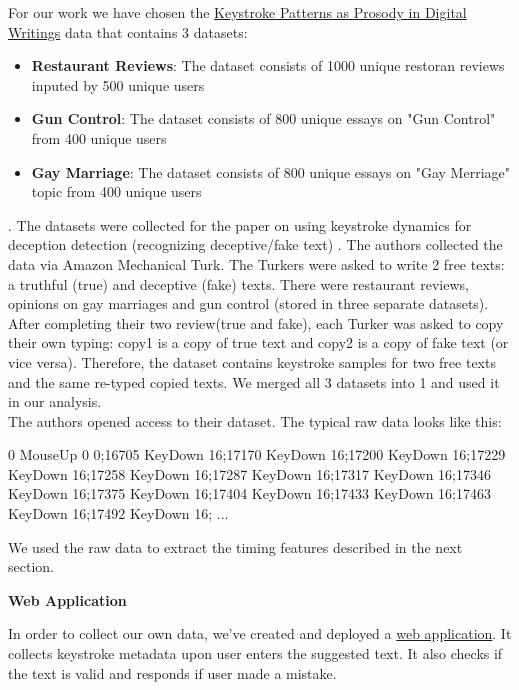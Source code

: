\documentclass[12pt,a4]{article}
\begin{document}
\normalsize
For our work we have chosen the  \href{http://www3.cs.stonybrook.edu/~rbanerjee/project-pages/keystrokes/keystrokes.html}{Keystroke Patterns as Prosody in Digital Writings} data \cite{banerjee2014_emnlp} that contains 3 datasets: \begin{itemize}
	\item \textbf{Restaurant Reviews}: The dataset consists of 1000 unique restoran reviews inputed by 500 unique users
	\item \textbf{Gun Control}: The dataset consists of 800 unique essays on "Gun Control" from 400 unique users
	\item \textbf{Gay Marriage}: The dataset consists of 800 unique essays on "Gay Merriage" topic  from 400 unique users
\end{itemize}.
The datasets were collected for the paper on using keystroke dynamics for
deception detection (recognizing deceptive/fake text) \cite{banerjee2014_emnlp}. The authors collected the data via Amazon Mechanical Turk. The Turkers were asked to write 2 free texts: a truthful (true) and deceptive (fake) texts. There were restaurant reviews, opinions on gay marriages and gun control (stored in three separate datasets). After completing their two review(true and fake), each Turker was asked to copy their own typing: copy1 is a copy of true text and copy2 is a copy of fake text (or vice versa). Therefore, the dataset contains keystroke samples for two free texts and the same re-typed copied texts. We merged all 3 datasets into 1 and used it in our analysis. \\

The authors opened access to their dataset. The typical raw data looks like this:
\bigskip

\begin{text}
	0 MouseUp 0 0;16705 KeyDown 16;17170 KeyDown 16;17200 KeyDown 16;17229 KeyDown 16;17258 KeyDown 16;17287 KeyDown 16;17317 KeyDown 16;17346 KeyDown 16;17375 KeyDown 16;17404 KeyDown 16;17433 KeyDown 16;17463 KeyDown 16;17492 KeyDown 16; ...
\end{text}
\bigskip

We used the raw data to extract the timing features described in the next section.

\bigskip
\large\textbf{Web Application}
\bigskip

\normalsize
In order to collect our own data, we've created and deployed a \href{https://powerful-spire-05992.herokuapp.com/}{web application}. It collects keystroke metadata upon user enters the suggested text. It also checks if the text is valid and responds if user made a mistake.
\end{document}
